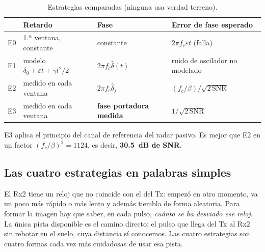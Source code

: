 \documentclass[11pt,a4paper]{article}
\begin{document}
\begin{table}[H]
\centering\small
\caption{Estrategias comparadas (ninguna usa verdad terreno).}
\label{tab:estr}
\begin{tabular}{@{}llll@{}}
\toprule
 & Retardo & Fase & Error de fase esperado \\
\midrule
E0 & 1.ª ventana, constante & constante & $2\pi f_c\varepsilon t$ (falla) \\
E1 & modelo $\delta_0+\varepsilon t+\gamma t^2/2$ & $2\pi f_c\hat\delta(t)$ & ruido de oscilador no modelado \\
E2 & medido en cada ventana & $2\pi f_c\hat\delta_j$ & $(f_c/\beta)/\sqrt{2\,\mathrm{SNR}}$ \\
E3 & medido en cada ventana & \textbf{fase portadora medida} & $1/\sqrt{2\,\mathrm{SNR}}$ \\
\bottomrule
\end{tabular}
\end{table}

E3 aplica el principio del canal de referencia del radar pasivo. Es mejor
que E2 en un factor $(f_c/\beta)^2=1124$, es decir, \textbf{30.5~dB de SNR}.

\subsection*{Las cuatro estrategias en palabras simples}

El Rx2 tiene un reloj que no coincide con el del Tx: empezó en otro
momento, va un poco más rápido o más lento y además tiembla de forma
aleatoria. Para formar la imagen hay que saber, en cada pulso, \emph{cuánto
se ha desviado ese reloj}. La única pista disponible es el camino directo:
el pulso que llega del Tx al Rx2 sin rebotar en el suelo, cuya distancia sí
conocemos. Las cuatro estrategias son cuatro formas cada vez más cuidadosas
de usar esa pista.
\end{document}
